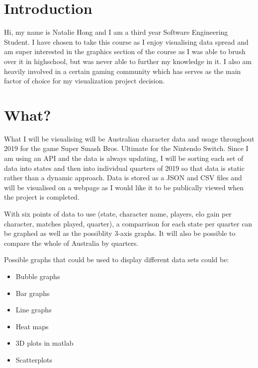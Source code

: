 \documentclass[11pt, oneside, a4paper]{article}
\begin{document}
\section*{Introduction}
Hi, my name is Natalie Hong and I am a third year Software Engineering Student. I have chosen to take this course as I enjoy visualising data spread and am super interested in the graphics section of the course as I was able to brush over it in highschool, but was never able to further my knowledge in it.
I also am heavily involved in a certain gaming community which has serves as the main factor of choice for my visualization project decision.

\section*{What?}
What I will be visualising will be Australian character data and usage throughout 2019 for the game Super Smash Bros. Ultimate for the Nintendo Switch. 
Since I am using an API and the data is always updating, I will be sorting each set of data into states and then into individual quarters of 2019 so that data is static rather than a dynamic approach.
Data is stored as a JSON and CSV files and will be visualised on a webpage as I would like it to be publically viewed when the project is completed.

With six points of data to use (state, character name, players, elo gain per character, matches played, quarter), a comparrison for each state per quarter can be graphed as well as the possiblity 3-axis graphs. It will also be possible to compare the whole of Australia by quarters.

Possible graphs that could be used to display different data sets could be:
\begin{itemize}
    \item Bubble graphs
    \item Bar graphs
    \item Line graphs
    \item Heat maps
    \item 3D plots in matlab
    \item Scatterplots
\end{itemize}
\end{document}
